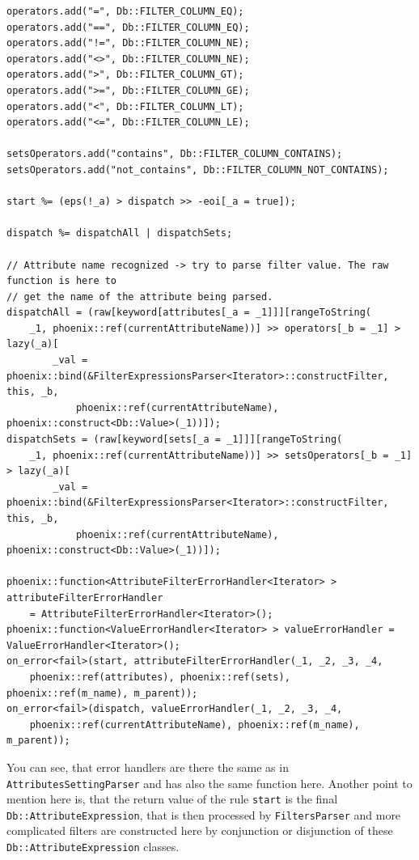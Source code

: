 \documentclass[deska]{subfiles}
\begin{document}
\begin{verbatim}
operators.add("=", Db::FILTER_COLUMN_EQ);
operators.add("==", Db::FILTER_COLUMN_EQ);
operators.add("!=", Db::FILTER_COLUMN_NE);
operators.add("<>", Db::FILTER_COLUMN_NE);
operators.add(">", Db::FILTER_COLUMN_GT);
operators.add(">=", Db::FILTER_COLUMN_GE);
operators.add("<", Db::FILTER_COLUMN_LT);
operators.add("<=", Db::FILTER_COLUMN_LE);

setsOperators.add("contains", Db::FILTER_COLUMN_CONTAINS);
setsOperators.add("not_contains", Db::FILTER_COLUMN_NOT_CONTAINS);

start %= (eps(!_a) > dispatch >> -eoi[_a = true]);

dispatch %= dispatchAll | dispatchSets;

// Attribute name recognized -> try to parse filter value. The raw function is here to
// get the name of the attribute being parsed.
dispatchAll = (raw[keyword[attributes[_a = _1]]][rangeToString(
    _1, phoenix::ref(currentAttributeName))] >> operators[_b = _1] > lazy(_a)[
        _val = phoenix::bind(&FilterExpressionsParser<Iterator>::constructFilter, this, _b,
            phoenix::ref(currentAttributeName), phoenix::construct<Db::Value>(_1))]);
dispatchSets = (raw[keyword[sets[_a = _1]]][rangeToString(
    _1, phoenix::ref(currentAttributeName))] >> setsOperators[_b = _1] > lazy(_a)[
        _val = phoenix::bind(&FilterExpressionsParser<Iterator>::constructFilter, this, _b,
            phoenix::ref(currentAttributeName), phoenix::construct<Db::Value>(_1))]);

phoenix::function<AttributeFilterErrorHandler<Iterator> > attributeFilterErrorHandler
    = AttributeFilterErrorHandler<Iterator>();
phoenix::function<ValueErrorHandler<Iterator> > valueErrorHandler = ValueErrorHandler<Iterator>();
on_error<fail>(start, attributeFilterErrorHandler(_1, _2, _3, _4,
    phoenix::ref(attributes), phoenix::ref(sets), phoenix::ref(m_name), m_parent));
on_error<fail>(dispatch, valueErrorHandler(_1, _2, _3, _4,
    phoenix::ref(currentAttributeName), phoenix::ref(m_name), m_parent));
\end{verbatim}

You can see, that error handlers are there the same as in {\tt AttributesSettingParser} and has also the same function here.
Another point to mention here is, that the return value of the rule {\tt start} is the final {\tt Db::AttributeExpression},
that is then processed by {\tt FiltersParser} and more complicated filters are constructed here by conjunction or disjunction
of these {\tt Db::AttributeExpression} classes.
\end{document}
